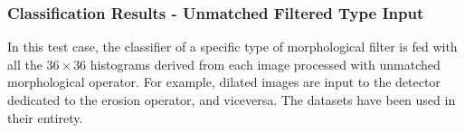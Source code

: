 \documentclass[review]{elsarticle}
\begin{document}
\subsubsection{Classification Results - Unmatched Filtered Type Input}
In this test case, the classifier of a specific type of morphological filter is fed with all the $36\times 36$ histograms derived from each image processed with unmatched morphological operator. For example, dilated images are input to the detector dedicated to the erosion operator, and viceversa. The datasets have been used in their entirety. 

\end{document}
